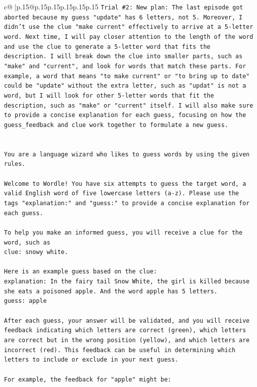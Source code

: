 \documentclass{article}
\begin{document}
{\begin{supertabular}{c@{$\;$}|p{.15\linewidth}@{}p{.15\linewidth}p{.15\linewidth}p{.15\linewidth}p{.15\linewidth}p{.15\linewidth}}
{{{\texttt{Trial \#2: New plan: The last episode got aborted because my guess "update" has 6 letters, not 5. Moreover, I didn't use the clue "make current" effectively to arrive at a 5{-}letter word. Next time, I will pay closer attention to the length of the word and use the clue to generate a 5{-}letter word that fits the description. I will break down the clue into smaller parts, such as "make" and "current", and look for words that match these parts. For example, a word that means "to make current" or "to bring up to date" could be "update" without the extra letter, such as "updat" is not a word, but I will look for other 5{-}letter words that fit the description, such as "make" or "current" itself. I will also make sure to provide a concise explanation for each guess, focusing on how the guess\_feedback and clue work together to formulate a new guess.} \\
\\ 
\\ 
\texttt{You are a language wizard who likes to guess words by using the given rules.} \\
\\ 
\texttt{Welcome to Wordle! You have six attempts to guess the target word, a valid English word of five lowercase letters (a{-}z). Please use the tags "explanation:" and "guess:" to provide a concise explanation for each guess.} \\
\\ 
\texttt{To help you make an informed guess, you will receive a clue for the word, such as} \\
\texttt{clue: snowy white.} \\
\\ 
\texttt{Here is an example guess based on the clue:} \\
\texttt{explanation: In the fairy tail Snow White, the girl is killed because she eats a poisoned apple. And the word apple has 5 letters.} \\
\texttt{guess: apple} \\
\\ 
\texttt{After each guess, your answer will be validated, and you will receive feedback indicating which letters are correct (green), which letters are correct but in the wrong position (yellow), and which letters are incorrect (red). This feedback can be useful in determining which letters to include or exclude in your next guess.} \\
\\ 
\texttt{For example, the feedback for "apple" might be:} \\
}}}
\end{supertabular}}
\end{document}
